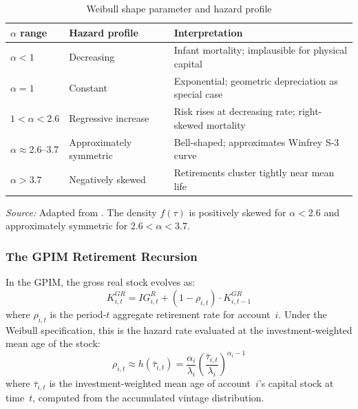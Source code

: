 \begin{table}[htbp]
\centering
\caption{Weibull shape parameter and hazard profile}
\label{tab:ret:shape_interp}
\begin{threeparttable}
\begin{tabular}{lll}
\toprule
$\alpha$ range & Hazard profile & Interpretation \\
\midrule
$\alpha < 1$       & Decreasing      & Infant mortality; implausible for physical capital \\
$\alpha = 1$       & Constant        & Exponential; geometric depreciation as special case \\
$1 < \alpha < 2.6$ & Regressive increase & Risk rises at decreasing rate; right-skewed mortality \\
$\alpha \approx 2.6$--$3.7$ & Approximately symmetric & Bell-shaped; approximates Winfrey S-3 curve \\
$\alpha > 3.7$     & Negatively skewed & Retirements cluster tightly near mean life \\
\bottomrule
\end{tabular}
\begin{tablenotes}
\small
\item \textit{Source:} Adapted from \citet[Section~3.2]{Nomura2005}.
The density $f(\tau)$ is positively skewed for $\alpha < 2.6$ and
approximately symmetric for $2.6 < \alpha < 3.7$.
\end{tablenotes}
\end{threeparttable}
\end{table}


\subsubsection{The GPIM Retirement Recursion}
\label{app:ret:gpim_recursion}

In the GPIM, the gross real stock evolves as:
%
\begin{equation}
    K^{GR}_{i,t} = IG^{R}_{i,t} + (1 - \rho_{i,t}) \cdot K^{GR}_{i,t-1}
    \label{eq:ret:gpim}
\end{equation}
%
where $\rho_{i,t}$ is the period-$t$ aggregate retirement rate for account~$i$.
Under the Weibull specification, this is the hazard rate evaluated at the
investment-weighted mean age of the stock:
%
\begin{equation}
    \rho_{i,t} \approx h(\bar{\tau}_{i,t})
    = \frac{\alpha_i}{\lambda_i}
    \left(\frac{\bar{\tau}_{i,t}}{\lambda_i}\right)^{\alpha_i - 1}
    \label{eq:ret:rho_weibull}
\end{equation}
%
where $\bar{\tau}_{i,t}$ is the investment-weighted mean age of account~$i$'s
capital stock at time~$t$, computed from the accumulated vintage distribution.

